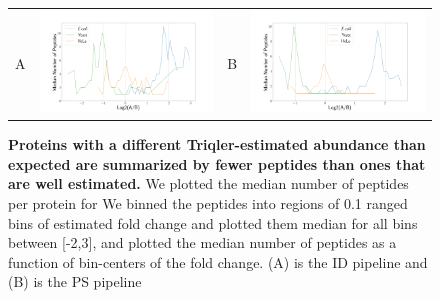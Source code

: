 \documentclass[11pt]{article}
\begin{document}
\begin{figure}[hbt]
    \centering
    \centering
    \begin{tabular}{lclc} 
        A & \includegraphics[width=0.5\linewidth]{../../result/report_plots_pipeline/fc_peptide_count_ID_triqler.png} &
        B & \includegraphics[width=0.5\linewidth]{../../result/report_plots_pipeline/fc_peptide_count_PS_triqler.png} \\
    \end{tabular}
    \caption{{\bf Proteins with a different Triqler-estimated abundance than expected are summarized by fewer peptides than ones that are well estimated.} We plotted the median number of peptides per protein for    
  We binned the peptides into regions of 0.1 ranged bins of estimated fold change and plotted them median for all bins between [-2,3], and plotted the median number of peptides as a function of bin-centers of the fold change. (A) is the ID pipeline and (B) is the PS pipeline \label{fig:number_of_peptides_supplement}}
\end{figure}
\end{document}
